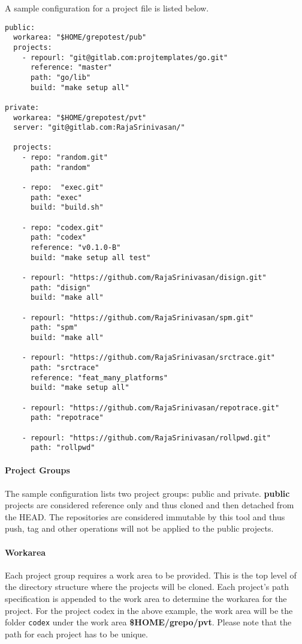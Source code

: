 \documentclass[11pt, a4paper]{article} %
\begin{document}
A sample configuration for a project file is listed below.

\begin{lstlisting}[caption=Example Project.yaml]
public:
  workarea: "$HOME/grepotest/pub"
  projects:
    - repourl: "git@gitlab.com:projtemplates/go.git"
      reference: "master"
      path: "go/lib"
      build: "make setup all"

private:
  workarea: "$HOME/grepotest/pvt"
  server: "git@gitlab.com:RajaSrinivasan/"

  projects:
    - repo: "random.git"
      path: "random"

    - repo:  "exec.git"
      path: "exec"
      build: "build.sh"

    - repo: "codex.git"
      path: "codex"
      reference: "v0.1.0-B"
      build: "make setup all test"

    - repourl: "https://github.com/RajaSrinivasan/disign.git"
      path: "disign"
      build: "make all"

    - repourl: "https://github.com/RajaSrinivasan/spm.git"
      path: "spm"
      build: "make all"

    - repourl: "https://github.com/RajaSrinivasan/srctrace.git"
      path: "srctrace"
      reference: "feat_many_platforms"
      build: "make setup all"

    - repourl: "https://github.com/RajaSrinivasan/repotrace.git"
      path: "repotrace"

    - repourl: "https://github.com/RajaSrinivasan/rollpwd.git"
      path: "rollpwd"

\end{lstlisting}

\paragraph{Project Groups} The sample configuration lists two project groups: public and private. \textbf{public} projects are considered reference only and thus cloned and then detached from the HEAD. The repositories are considered immutable by this tool and thus push, tag and other operations will not be applied to the public projects.

\paragraph{Workarea} Each project group requires a work area to be provided. This is the top level of the directory structure where the projects will be cloned. Each project's path specification is appended to the work area to determine the workarea for the project. For the project codex in the above example, the work area will be the folder \texttt{codex} under the work area \textbf{\$HOME/grepo/pvt}. Please note that the path for each project has to be unique.
\end{document}
